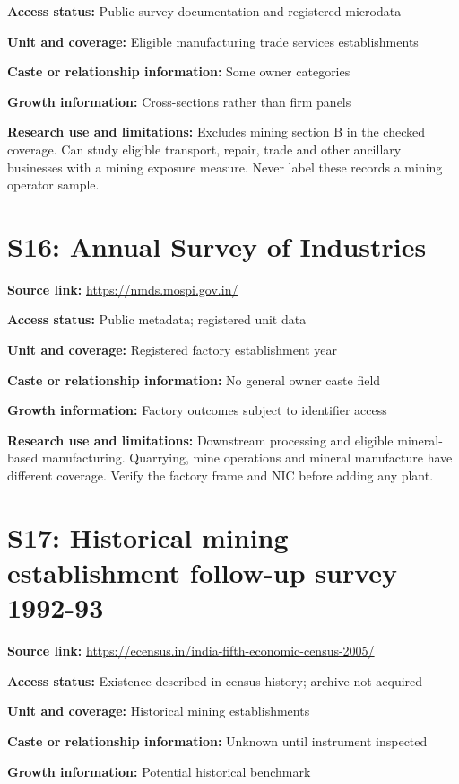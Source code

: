 \documentclass[11pt,a4paper]{report}
\begin{document}
\textbf{Access status:} Public survey documentation and registered microdata

\textbf{Unit and coverage:} Eligible manufacturing trade services establishments

\textbf{Caste or relationship information:} Some owner categories

\textbf{Growth information:} Cross-sections rather than firm panels

\textbf{Research use and limitations:} Excludes mining section B in the checked coverage. Can study eligible transport, repair, trade and other ancillary businesses with a mining exposure measure. Never label these records a mining operator sample.

\section{S16: Annual Survey of Industries}\hypertarget{S16}{}
\textbf{Source link:} \url{https://nmds.mospi.gov.in/}

\textbf{Access status:} Public metadata; registered unit data

\textbf{Unit and coverage:} Registered factory establishment year

\textbf{Caste or relationship information:} No general owner caste field

\textbf{Growth information:} Factory outcomes subject to identifier access

\textbf{Research use and limitations:} Downstream processing and eligible mineral-based manufacturing. Quarrying, mine operations and mineral manufacture have different coverage. Verify the factory frame and NIC before adding any plant.

\section{S17: Historical mining establishment follow-up survey 1992-93}\hypertarget{S17}{}
\textbf{Source link:} \url{https://ecensus.in/india-fifth-economic-census-2005/}

\textbf{Access status:} Existence described in census history; archive not acquired

\textbf{Unit and coverage:} Historical mining establishments

\textbf{Caste or relationship information:} Unknown until instrument inspected

\textbf{Growth information:} Potential historical benchmark
\end{document}
